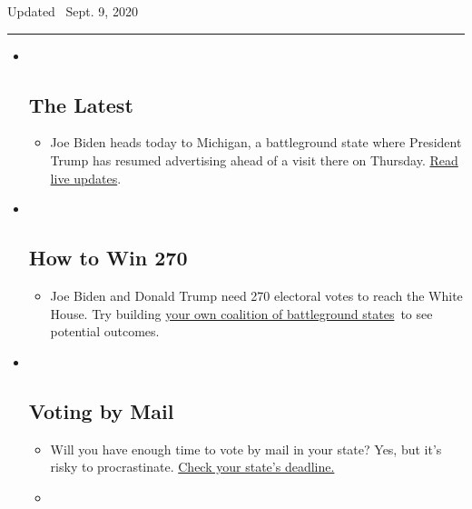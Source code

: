 Updated ~Sept. 9, 2020

\begin{center}\rule{0.5\linewidth}{\linethickness}\end{center}

\begin{itemize}
\item ~
  \hypertarget{the-latest}{%
  \subsection{The Latest}\label{the-latest}}

  \begin{itemize}
  \item
    Joe Biden heads today to Michigan, a battleground state where
    President Trump has resumed advertising ahead of a visit there on
    Thursday.
    \href{https://www.nytimes3xbfgragh.onion/live/2020/09/09/us/trump-vs-biden?action=click\&pgtype=Article\&state=default\&region=BELOW_MAIN_CONTENT\&context=storylines_guide}{Read
    live updates}.
  \end{itemize}
\item ~
  \hypertarget{how-to-win-270}{%
  \subsection{How to Win 270}\label{how-to-win-270}}

  \begin{itemize}
  \item
    Joe Biden and Donald Trump need 270 electoral votes to reach the
    White House. Try building
    \href{https://www.nytimes3xbfgragh.onion/interactive/2020/us/elections/election-states-biden-trump.html?action=click\&pgtype=Article\&state=default\&region=BELOW_MAIN_CONTENT\&context=storylines_guide}{your
    own coalition of battleground states}~to see potential outcomes.
  \end{itemize}
\item ~
  \hypertarget{voting-by-mail}{%
  \subsection{Voting by Mail}\label{voting-by-mail}}

  \begin{itemize}
  \item
    Will you have enough time to vote by mail in your state? Yes, but
    it's risky to procrastinate.
    \href{https://www.nytimes3xbfgragh.onion/interactive/2020/08/31/us/politics/vote-by-mail-deadlines.html?action=click\&pgtype=Article\&state=default\&region=BELOW_MAIN_CONTENT\&context=storylines_guide}{Check
    your state's deadline.}
  \item
    \href{https://www.nytimes3xbfgragh.onion/interactive/2020/us/elections/joe-biden.html?action=click\&pgtype=Article\&state=default\&region=BELOW_MAIN_CONTENT\&context=storylines_guide}{}


\end{itemize}
\end{itemize}

